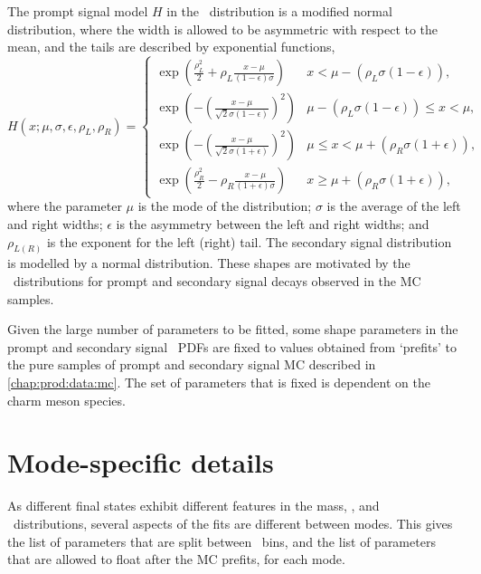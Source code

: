 The prompt signal model $H$ in the \lnipchisq\ distribution is a modified 
normal distribution, where the width is allowed to be asymmetric with respect 
to the mean, and the tails are described by exponential functions,
\begin{equation}
  H(x; \mu, \sigma, \epsilon, \rho_{L}, \rho_{R}) =
  \begin{cases}
    \exp\left(\frac{\rho_{L}^{2}}{2} + \rho_{L}\frac{x - \mu}{(1 - 
    \epsilon)\sigma}\right) & x < \mu - (\rho_{L}\sigma(1 - 
        \epsilon)), \\
    \exp\left(-\left(\frac{x - \mu}{\sqrt{2}\sigma(1 - 
    \epsilon)}\right)^{2}\right) & \mu - (\rho_{L}\sigma(1 - \epsilon)) 
          \leq x < \mu, \\
    \exp\left(-\left(\frac{x - \mu}{\sqrt{2}\sigma(1 + 
    \epsilon)}\right)^{2}\right) & \mu \leq x < \mu + (\rho_{R}\sigma(1 + 
          \epsilon)), \\
    \exp\left(\frac{\rho_{R}^{2}}{2} - \rho_{R}\frac{x - \mu}{(1 + 
    \epsilon)\sigma}\right) & x \geq \mu + (\rho_{R}\sigma(1 + 
        \epsilon)),
  \end{cases}
  \label{eqn:prod:fitting:ipchisq:signal_model}
\end{equation}
where the parameter $\mu$ is the mode of the distribution; $\sigma$ is the 
average of the left and right widths; $\epsilon$ is the asymmetry between the 
left and right widths; and $\rho_{L(R)}$ is the exponent for the left (right) 
tail.
The secondary signal distribution is modelled by a normal distribution.
These shapes are motivated by the \lnipchisq\ distributions for prompt and 
secondary signal decays observed in the \ac{MC} samples.

Given the large number of parameters to be fitted, some shape parameters in the 
prompt and secondary signal \lnipchisq\ \acp{PDF} are fixed to values obtained 
from `prefits' to the pure samples of prompt and secondary signal \ac{MC} 
described in \cref{chap:prod:data:mc}.
The set of parameters that is fixed is dependent on the charm meson species.

\section{Mode-specific details}
\label{chap:prod:fitting:details}

As different final states exhibit different features in the mass, \deltam, and 
\lnipchisq\ distributions, several aspects of the fits are different between 
modes.
This  gives the list of parameters that 
are split between \pTy\ bins, and the list of parameters that are allowed to 
float after the \ac{MC} prefits, for each mode.

